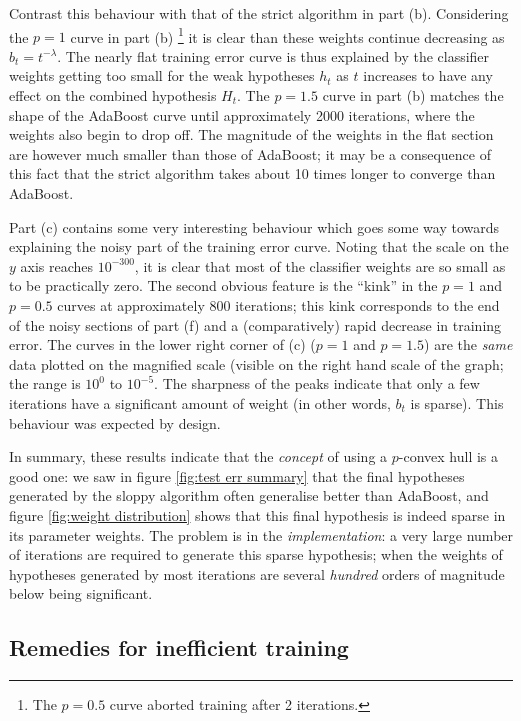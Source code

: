 Contrast this behaviour with that of the strict algorithm in part (b).
Considering the $p=1$ curve in part (b)%
\footnote{The $p=0.5$ curve aborted training after 2 iterations.}
it is clear than these weights continue decreasing as $b_t =
t^{-\lambda}$.  The nearly flat training error curve is thus explained
by the classifier weights getting too small for the weak hypotheses
$h_t$ as $t$ increases to have any effect on the combined hypothesis
$H_t$.  The $p=1.5$ curve in part (b) matches the shape of the
AdaBoost curve until approximately 2000 iterations, where the weights
also begin to drop off.  The magnitude of the weights in the flat
section are however much smaller than those of AdaBoost; it may be a
consequence of this fact that the strict algorithm takes about 10
times longer to converge than AdaBoost. 

Part (c) contains some very interesting behaviour which goes some way
towards explaining the noisy part of the training error curve.  Noting
that the scale on the $y$ axis reaches $10^{-300}$, it is clear that
most of the classifier weights are so small as to be practically
zero.  The second obvious feature is the ``kink'' in the $p=1$ and
$p=0.5$ curves at approximately 800 iterations; this kink corresponds
to the end of the noisy sections of part (f) and a (comparatively)
rapid decrease in training error.  The curves in the lower right
corner of (c) ($p=1$ and $p=1.5$) are the \emph{same} data plotted on
the magnified scale (visible on the right hand scale of the graph; the
range is $10^0$ to $10^{-5}$.  The sharpness of the peaks indicate
that only a few iterations have a significant amount of weight (in
other words, $b_t$ is sparse).  This behaviour was expected by design.

In summary, these results indicate that the \emph{concept} of using a
$p$-convex hull is a good one: we saw in figure \ref{fig:test err
summary} that the final hypotheses generated by the sloppy algorithm
often generalise better than AdaBoost, and figure \ref{fig:weight
distribution} shows that this final hypothesis is indeed sparse in
its parameter weights.  The problem is in the \emph{implementation}:
a very large number of iterations are required to generate this sparse
hypothesis; when the weights of hypotheses generated by most
iterations are several \emph{hundred} orders of magnitude below being
significant.


\subsection{Remedies for inefficient training}

